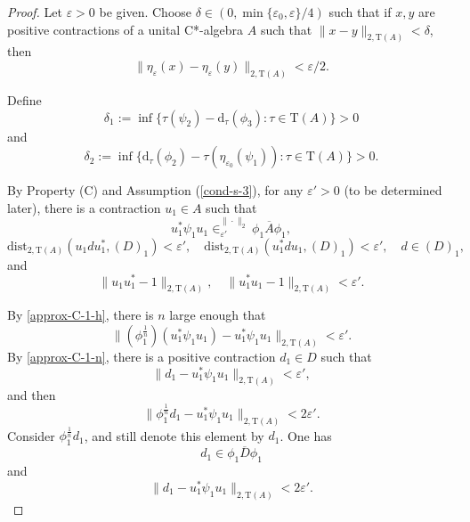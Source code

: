 \documentclass[10pt,a4paper]{amsart}
\newcommand{\eps}{\varepsilon}
\newcommand{\norm}[1]{\| #1\|}
\newcommand{\tr}{\mathrm{T}}
\begin{document}
\begin{proof}
Let $\eps>0$ be given. Choose $\delta \in (0, \min\{\eps_0, \eps\}/4)$ such that if $x, y$ are positive contractions of a unital C*-algebra $A$ such that $\norm{x - y}_{2, \tr(A)} < \delta$, then
\begin{equation}\label{pre-pert-delta}
\norm{\eta_\eps(x) - \eta_\eps(y)}_{2, \tr(A)} < \eps/2.
\end{equation}


Define
$$ \delta_1 := \inf\{\tau(\psi_2) - \mathrm{d}_\tau(\phi_3): \tau \in \tr(A)\} >0$$
and
$$\delta_2 := \inf\{\mathrm{d}_\tau(\phi_2) - \tau(\eta_{\eps_0}(\psi_1)): \tau \in \tr(A)\} > 0. $$

By Property (C) and Assumption (\ref{cond-s-3}), for any $\eps'>0$ (to be determined later), there is a contraction $u_1\in A$ such that
\begin{equation}\label{approx-C-1-h}
u^*_1 \psi_1 u_1 \in^{\norm{\cdot}_2}_{\eps'} \overline{\phi_1 A \phi_1}, 
\end{equation}
\begin{equation}\label{approx-C-1-n}
\mathrm{dist}_{2, \tr(A)}(u_1du^*_1, (D)_1) < \eps', \quad \mathrm{dist}_{2, \tr(A)}(u_1^*du_1, (D)_1) < \eps',\quad d \in (D)_1, 
\end{equation}
and
\begin{equation}\label{approx-C-1-u}
\norm{u_1u_1^* - 1}_{2, \tr(A)},\quad  \norm{u_1^*u_1 - 1}_{2, \tr(A)} < \eps'.
\end{equation}

By \eqref{approx-C-1-h}, there is $n$ large enough that $$ \norm{(\phi_1^{\frac{1}{n}}) (u_1^*\psi_1u_1) - u_1^*\psi_1u_1}_{2, \tr(A)} < \eps'. 
$$
By \eqref{approx-C-1-n}, there is a positive contraction $d_1 \in D$ such that
\begin{equation*}
\norm{d_1- u_1^*\psi_1u_1}_{2, \tr(A)}< \eps', 
\end{equation*}
and then
$$\norm{\phi_1^{\frac{1}{n}}d_1 - u_1^*\psi_1u_1}_{2, \tr(A)} < 2\eps'. 
$$
Consider $\phi_1^{\frac{1}{n}}d_1$, and still denote this element by $d_1$. One has $$d_1 \in \overline{\phi_1 D \phi_1}$$
and
\begin{equation}\label{approx-C-1}
\norm{d_1 - u_1^*\psi_1u_1}_{2, \tr(A)} < 2\eps'. 
\end{equation}



\end{proof}
\end{document}

